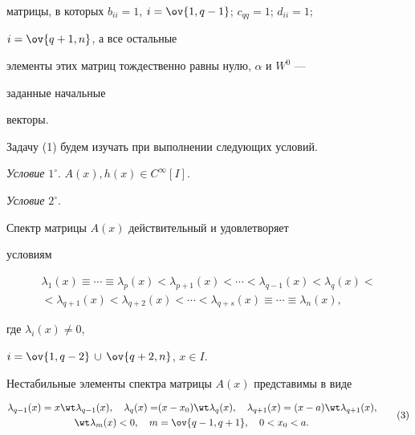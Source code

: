 матрицы, в которых $b_{ii}=1$, $i=\ov{1,q-1}$; $c_{qq}=1$; $d_{ii}=1$; 


$i=\ov{q+1,n}$, а все остальные 


элементы этих матриц тождественно равны нулю, $\alpha$ и $W^0$ --- 


заданные начальные 


векторы. 


 


Задачу (1) будем изучать при выполнении следующих условий. 


 


{\it Условие} $1^\circ$. $A(x),h(x)\in C^\infty[I]$. 


 


{\it Условие} $2^\circ$. 


Спектр матрицы $A(x)$ действительный и удовлетворяет 


условиям 


\begin{multline} 


\lambda_1(x)\equiv\dotsb\equiv\lambda_p(x)<\lambda_{p+1}(x) 


<\dotsb<\lambda_{q-1}(x)<\lambda_q(x)< \\ 


<\lambda_{q+1}(x)<\lambda_{q+2}(x)<\dotsb<\lambda_{q+s}(x) 


\equiv\dotsb\equiv\lambda_n(x), 


\tag{2} 


\end{multline} 


где $\lambda_i(x)\ne 0$, 


$i=\ov{1,q-2}\,\cup\,\ov{q+2,n}$, $x\in I$. 


 


Нестабильные элементы спектра матрицы $A(x)$ представимы в виде 


\begin{equation} 


\begin{split}


\lambda_{q-1}(x)=x\wt\lambda_{q-1}(x),\quad 


\lambda_q(x)=&(x-x_0)\wt\lambda_q(x),\quad 


\lambda_{q+1}(x)=(x-a)\wt\lambda_{q+1}(x),\\ 


\wt\lambda_m(x)<0,\quad m&=\ov{q-1,q+1},\quad 0<x_0<a. 


\end{split}


\tag{3} 


\end{equation} 


